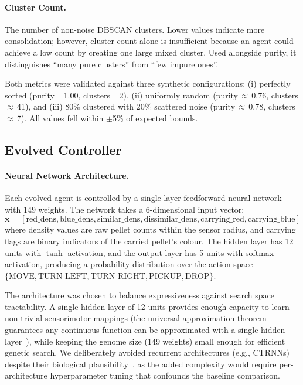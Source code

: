 \documentclass[11pt,a4paper]{article}
\begin{document}
\paragraph{Cluster Count.} The number of non-noise DBSCAN clusters. Lower values indicate more consolidation; however, cluster count alone is insufficient because an agent could achieve a low count by creating one large mixed cluster. Used alongside purity, it distinguishes ``many pure clusters'' from ``few impure ones''.

Both metrics were validated against three synthetic configurations: (i) perfectly sorted (purity\,=\,1.00, clusters\,=\,2), (ii) uniformly random (purity\,$\approx$\,0.76, clusters\,$\approx$\,41), and (iii) 80\% clustered with 20\% scattered noise (purity\,$\approx$\,0.78, clusters\,$\approx$\,7). All values fell within $\pm$5\% of expected bounds.

\subsection{Evolved Controller}
\label{sec:methods:evolved}

\paragraph{Neural Network Architecture.}
Each evolved agent is controlled by a single-layer feedforward neural network with 149 weights. The network takes a 6-dimensional input vector:
\[\mathbf{x} = [\text{red\_dens}, \text{blue\_dens}, \text{similar\_dens}, \text{dissimilar\_dens}, \text{carrying\_red}, \text{carrying\_blue}]\]
where density values are raw pellet counts within the sensor radius, and carrying flags are binary indicators of the carried pellet's colour. The hidden layer has 12 units with \(\tanh\) activation, and the output layer has 5 units with softmax activation, producing a probability distribution over the action space \(\{\text{MOVE}, \text{TURN\_LEFT}, \text{TURN\_RIGHT}, \text{PICKUP}, \text{DROP}\}\).

The architecture was chosen to balance expressiveness against search space tractability. A single hidden layer of 12 units provides enough capacity to learn non-trivial sensorimotor mappings (the universal approximation theorem guarantees any continuous function can be approximated with a single hidden layer~\cite{cybenko1989}), while keeping the genome size (149 weights) small enough for efficient genetic search. We deliberately avoided recurrent architectures (e.g., CTRNNs) despite their biological plausibility~\cite{trianni2002}, as the added complexity would require per-architecture hyperparameter tuning that confounds the baseline comparison.
\end{document}
